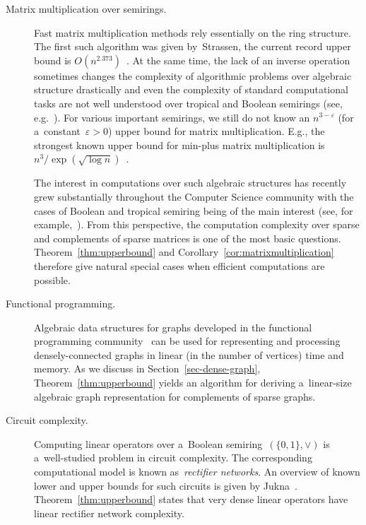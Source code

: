 \documentclass[11pt,letterpaper]{article}
\begin{document}
\begin{description}
\item[Matrix multiplication over semirings.] Fast matrix
multiplication methods rely essentially on the ring structure.
The first such algorithm was given by~Strassen,
the current record upper bound is $O(n^{2.373})$~\cite{DBLP:conf/stoc/Williams12, DBLP:conf/issac/Gall14a}.
At the same time, the lack of an inverse operation sometimes
changes the complexity of algorithmic problems over algebraic
structure drastically and even the complexity of standard
computational tasks are not well understood over tropical and
Boolean semirings (see, e.g.~\cite{Williams14,GrigorievP15}).
For various important semirings,
we still do not know an $n^{3-\varepsilon}$ (for a~constant~$\varepsilon>0$) upper
bound for matrix multiplication.
E.g., the strongest known upper bound for min-plus matrix
multiplication is $n^3/\exp(\sqrt{\log n})$~\cite{Williams14}.

The interest in computations over such algebraic structures has
recently grew substantially throughout the
Computer Science community with the cases of Boolean and
tropical semiring being of the main interest (see, for
example,~\cite{Jukna16,Williams14,butkovic10systems}).
From this perspective, the computation complexity over sparse and complements of
sparse matrices is one of the most basic questions.
Theorem~\ref{thm:upperbound} and Corollary~\ref{cor:matrixmultiplication}
therefore give natural special
cases when efficient computations are possible.

\item[Functional programming.]
Algebraic data structures for graphs developed in the functional programming
community~\cite{mokhov2017algebraic} can be used for representing and processing
densely-connected graphs in linear (in the number of vertices) time and memory.
As we discuss in Section~\ref{sec-dense-graph}, Theorem~\ref{thm:upperbound}
yields an algorithm for deriving a~linear-size algebraic graph representation
for complements of sparse graphs.

\item[Circuit complexity.] Computing linear operators over
a~Boolean semiring~$(\{0,1\}, \lor)$ is a~well-studied problem
in circuit complexity. The corresponding computational model is known
as~\emph{rectifier networks}. An overview of known lower and upper bounds for
such circuits is given by Jukna~\cite[Section~13.6]{DBLP:books/daglib/0028687}.
Theorem~\ref{thm:upperbound} states that very dense linear operators have
linear rectifier network complexity.
\end{description}
\end{document}
